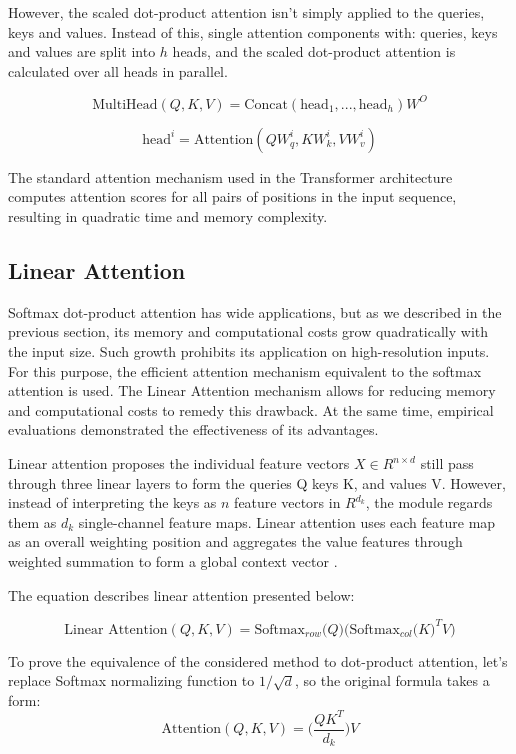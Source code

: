 However, the scaled dot-product attention isn't simply applied to the queries, keys and values. Instead of this, single attention components with: queries, keys and values are split into $ h $ heads, and the scaled dot-product attention is calculated over all heads in parallel.

$$ \text{MultiHead}(Q, K, V) = \text{Concat}(\text{head}_1,...,\text{head}_h)W^O $$

$$ \text{head}^i = \text{Attention}(QW_q^i, KW_k^i, VW_v^i) $$

The standard attention mechanism used in the Transformer architecture computes attention scores for all pairs of positions in the input sequence, resulting in quadratic time and memory complexity.


\subsection{Linear Attention}

Softmax dot-product attention has wide applications, but as we described in the previous section, its memory and computational costs grow quadratically with the input size. Such growth prohibits its application on high-resolution inputs. For this purpose, the efficient attention mechanism equivalent to the softmax attention is used. The Linear Attention mechanism allows for reducing memory and computational costs to remedy this drawback. At the same time, empirical evaluations \cite{linear-attention-transformer} demonstrated the effectiveness of its advantages.

Linear attention proposes the individual feature vectors $ X \in R^{n \times d} $ still pass through three linear layers to form the queries Q keys K, and values V. However, instead of interpreting the keys as $n$ feature vectors in $R^{d_k}$, the module regards them as $d_k$ single-channel feature maps. Linear attention uses each feature map as an overall weighting position and aggregates the value features through weighted summation to form a global context vector \cite{efficient-linear-attention}. 

The equation describes linear attention presented below:

$$ \text{Linear Attention}(Q, K, V) = \text{Softmax}_{row} \big(Q)\big ( \text{Softmax}_{col} \big( K \big)^T V) $$ 

To prove the equivalence of the considered method to dot-product attention, let's replace Softmax normalizing function to $1 / \sqrt{d}$, so the original formula takes a form:
$$ \text{Attention}(Q, K, V) = \big( \frac{QK^T}{d_k} \big)V $$ 

